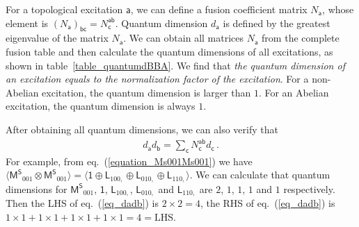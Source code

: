 \documentclass[11pt,nofootinbib,preprint]{revtex4-1}
\begin{document}
For a topological excitation $\mathsf{a}$, we can define a fusion coefficient matrix $N_{\mathsf{a}}$, whose element is $ \left( N_{\mathsf{a}} \right) _{\mathsf{b}\mathsf{c}}=N_{\mathsf{c}}^{\mathsf{a}\mathsf{b}}$. Quantum dimension $d_{\mathsf{a}}$ is defined by the greatest eigenvalue of the matrix $N_{\mathsf{a}}$. We can obtain all matrices $N_{\mathsf{a}}$ from the complete fusion table and then calculate the quantum dimensions of all excitations, as shown in table~\ref{table_quantumdBBA}. We find that \textit{the quantum dimension of an excitation equals to the normalization factor of the excitation}.  For a non-Abelian excitation, the quantum dimension is larger than $1$. For an Abelian excitation, the quantum dimension is always $1$. 

After obtaining all quantum dimensions, we can also verify that  
\begin{align}
	d_{\mathsf{a}}d_{\mathsf{b}}=\sum_{\mathsf{c}}{N_{\mathsf{c}}^{\mathsf{ab}}d_{\mathsf{c}}}\,. \label{eq_dadb}
\end{align}
For example, from eq.~(\ref{equation_Ms001Ms001}) we have $\langle {\mathsf{M}^{\mathsf{S}}}_{001}\otimes {\mathsf{M}^{\mathsf{S}}}_{001}\rangle =\langle \mathsf{1}\oplus \mathsf{L}_{100,}\oplus \mathsf{L}_{010,}\oplus \mathsf{L}_{110,}\rangle $. We can calculate that quantum dimensions for ${\mathsf{M}^{\mathsf{S}}}_{001}$, $\mathsf{1}$, $\mathsf{L}_{100,}$, $\mathsf{L}_{010,}$ and $\mathsf{L}_{110,}$ are $2$, $1$, $1$, $1$ and $1$ respectively. Then the LHS of eq.~(\ref{eq_dadb}) is $2\times2=4$, the RHS of eq.~(\ref{eq_dadb}) is $1\times1+1\times1+1\times1+1\times1=4=\text{LHS}$.
 
\end{document}

